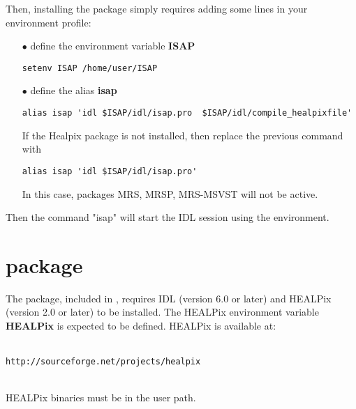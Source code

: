 Then, installing the {\isap} package simply requires adding some lines in your environment profile:
\begin{itemize}
\item[$\bullet$] {define the environment variable \textbf{ISAP}}  
\begin{verbatim}
setenv ISAP /home/user/ISAP
\end{verbatim}
 \item[$\bullet$]{define the alias \textbf{isap}}  
\begin{verbatim}
alias isap 'idl $ISAP/idl/isap.pro  $ISAP/idl/compile_healpixfile' 
\end{verbatim}
If the Healpix package is not installed, then replace the previous command with
\begin{verbatim}
alias isap 'idl $ISAP/idl/isap.pro' 
\end{verbatim}
In this case, packages MRS, MRSP, MRS-MSVST  will not be active.

\end{itemize}
Then the command "isap" will start the IDL session using the {\isap} environment. 


\section{\projmrs package}
 
The \mrs package, included in  {\isap}, requires IDL (version 6.0 or later) and HEALPix (version 2.0 or later) to be installed. The HEALPix environment 
variable \textbf{HEALPix} is expected to be defined. HEALPix is available at:\\ \\
{\centerline{\texttt{http://sourceforge.net/projects/healpix}}}\\

 HEALPix binaries must be in the user path.
  
